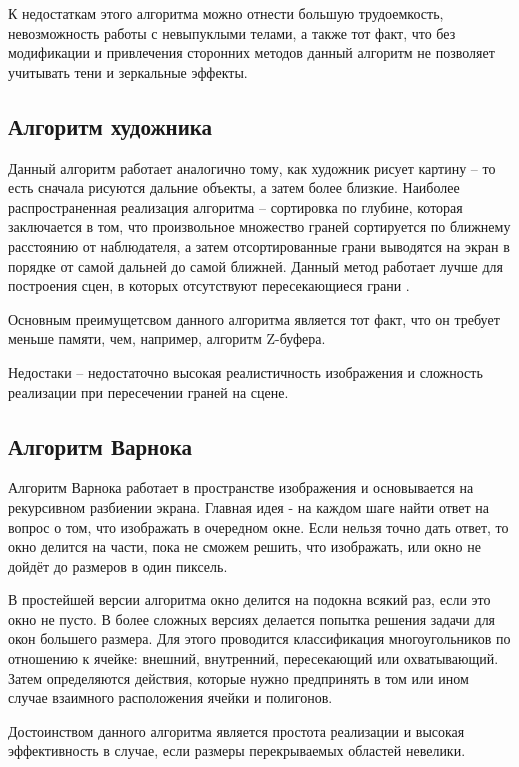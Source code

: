К недостаткам этого алгоритма можно отнести большую трудоемкость, невозможность работы с невыпуклыми телами, а также тот факт, что без модификации и привлечения сторонних методов данный алгоритм не позволяет учитывать тени и зеркальные эффекты.

\subsection{Алгоритм художника}
Данный алгоритм работает аналогично тому, как художник рисует картину – то есть сначала рисуются дальние объекты, а затем более близкие. Наиболее распространенная реализация алгоритма – сортировка по глубине, которая заключается в том, что произвольное множество граней сортируется по ближнему расстоянию от наблюдателя, а затем отсортированные грани выводятся на экран в порядке от самой дальней до самой ближней. Данный метод работает лучше для построения сцен, в которых отсутствуют пересекающиеся грани \cite{hudognik}. 

Основным преимущетсвом данного алгоритма является тот факт, что он требует меньше памяти, чем, например, алгоритм Z-буфера. 

Недостаки -- недостаточно высокая реалистичность изображения и сложность реализации при пересечении граней на сцене.

\subsection{Алгоритм Варнока}

Алгоритм Варнока \cite{varnok} работает в пространстве изображения и основывается на рекурсивном разбиении экрана. Главная идея - на каждом шаге найти ответ на вопрос о том, что изображать в очередном окне. Если нельзя точно дать ответ, то окно делится на части, пока не сможем решить, что изображать, или окно не дойдёт до размеров в один пиксель.

В простейшей версии алгоритма окно делится на подокна всякий раз, если это окно не пусто. В более сложных версиях делается попытка решения задачи для окон большего размера. Для этого проводится классификация
многоугольников по отношению к ячейке: внешний, внутренний, пересекающий или охватывающий. Затем определяются действия, которые нужно предпринять
в том или ином случае взаимного расположения ячейки и полигонов.

Достоинством данного алгоритма является простота реализации и высокая эффективность в случае, если размеры перекрываемых областей невелики.

